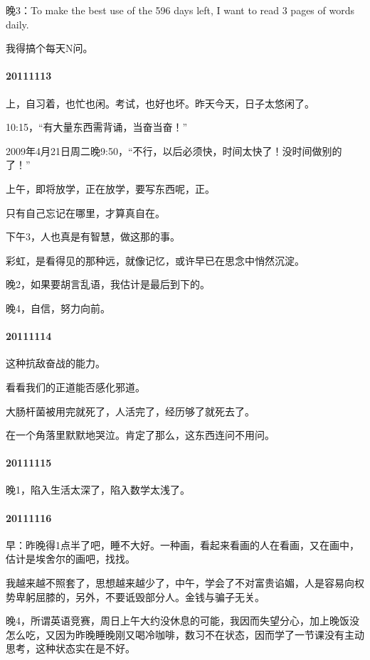 \documentclass[UTF8]{book}
\begin{document}
晚3：To make the best use of the 596 days left, I want to read 3 pages of words daily.

我得搞个每天N问。


\paragraph{20111113}

上，自习着，也忙也闲。考试，也好也坏。昨天今天，日子太悠闲了。

10:15，“有大量东西需背诵，当奋当奋！”

2009年4月21日周二晚9:50，“不行，以后必须快，时间太快了！没时间做别的了！”

上午，即将放学，正在放学，要写东西呢，正。

只有自己忘记在哪里，才算真自在。

下午3，人也真是有智慧，做这那的事。

彩虹，是看得见的那种远，就像记忆，或许早已在思念中悄然沉淀。

晚2，如果要胡言乱语，我估计是最后到下的。

晚4，自信，努力向前。


\paragraph{20111114}

这种抗敌奋战的能力。

看看我们的正道能否感化邪道。

大肠杆菌被用完就死了，人活完了，经历够了就死去了。

在一个角落里默默地哭泣。肯定了那么，这东西连问不用问。


\paragraph{20111115}

晚1，陷入生活太深了，陷入数学太浅了。


\paragraph{20111116}

早：昨晚得1点半了吧，睡不大好。一种画，看起来看画的人在看画，又在画中，估计是埃舍尔的画吧，找找。

我越来越不照套了，思想越来越少了，中午，学会了不对富贵谄媚，人是容易向权势卑躬屈膝的，另外，不要诋毁部分人。金钱与骗子无关。

晚4，所谓英语竞赛，周日上午大约没休息的可能，我因而失望分心，加上晚饭没怎么吃，又因为昨晚睡晚刚又喝冷咖啡，数习不在状态，因而学了一节课没有主动思考，这种状态实在是不好。
\end{document}
